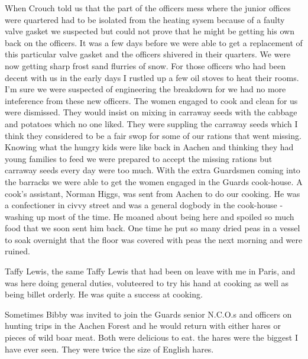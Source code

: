 When \sapper Crouch told us that the part of the officers mess where
the junior offices were quartered had to be isolated from the heating
sysem because of a faulty valve gasket we suspected but could not
prove that he might be getting his own back on the officers. It was a
few days before we were able to get a replacement of this particular
valve gasket and the officers shivered in their quarters. We were now
getting sharp frost sand flurries of snow. For those officers who had
been decent with us in the early days I rustled up a few oil stoves to
heat their rooms. I'm sure we were suspected of engineering the
breakdown for we had no more inteference from these new officers. The
women engaged to cook and clean for us were dismissed. They would
insist on mixing in carraway seeds with the cabbage and potatoes which
no one liked. They were suppling the carraway seeds which I think they
considered to be a fair swop for some of our rations that went
missing. Knowing what the hungry kids were like back in Aachen and
thinking they had young families to feed we were prepared to accept
the missing rations but carraway seeds every day were too much. With
the extra Guardsmen coming into the barracks we were able to get the
women engaged in the Guards cook-house. A cook's assistant, Norman
Higgs, was sent from Aachen to do our cooking. He was a confectioner
in civvy street and was a general dogbody in the cook-house - washing
up most of the time. He moaned about being here and spoiled so much
food that we soon sent him back. One time he put so many dried peas in
a vessel to soak overnight that the floor was covered with peas the
next morning and were ruined.

Taffy Lewis, the same Taffy Lewis that had been on leave with me in
Paris, and was here doing general duties, voluteered to try his hand
at cooking as well as being billet orderly. He was quite a success at
cooking.

Sometimes Bibby was invited to join the Guards senior N.C.O.s and
officers on hunting trips in the Aachen Forest and he would return
with either hares or pieces of wild boar meat. Both were delicious to
eat. the hares were the biggest I have ever seen. They were twice the
size of English hares.

